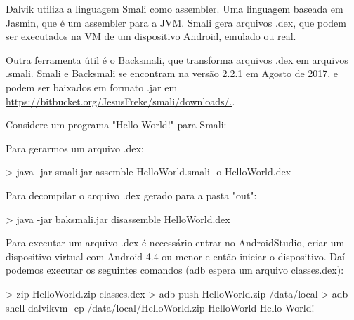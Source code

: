 \documentclass[12pt,a4paper,twoside]{report}
\begin{document}
Dalvik utiliza a linguagem Smali como assembler. Uma linguagem baseada
em Jasmin, que é um assembler para a JVM. Smali gera arquivos .dex, que
podem ser executados na VM de um dispositivo Android, emulado ou real.

Outra ferramenta útil é o Backsmali, que transforma arquivos .dex em
arquivos .smali. Smali e Backsmali se encontram na versão 2.2.1 em Agosto de 2017,
e podem ser baixados em formato .jar em \url{https://bitbucket.org/JesusFreke/smali/downloads/.}.

Considere um programa "Hello World!" para Smali:



Para gerarmos um arquivo .dex:
\begin{terminal}
> java -jar smali.jar assemble HelloWorld.smali -o HelloWorld.dex
\end{terminal}

Para decompilar o arquivo .dex gerado para a pasta "out":
\begin{terminal}
> java -jar baksmali.jar disassemble HelloWorld.dex
\end{terminal}

Para executar um arquivo .dex é necessário entrar no AndroidStudio,
criar um dispositivo virtual com Android 4.4 ou menor e então iniciar o dispositivo.
Daí podemos executar os seguintes comandos (adb espera um arquivo classes.dex):
\begin{terminal}
> zip HelloWorld.zip classes.dex
> adb push HelloWorld.zip /data/local
> adb shell dalvikvm -cp /data/local/HelloWorld.zip HelloWorld
Hello World!
\end{terminal}
\end{document}
